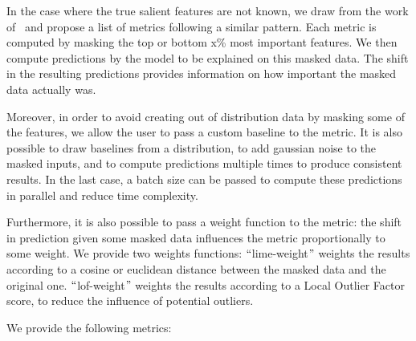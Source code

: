 In the case where the true salient features are not known, we draw from the work
of~\citep{shrikumar2017learning,deyoung2019eraser,crabbe2021explaining} and propose a list of metrics following a
similar pattern.
Each metric is computed by masking the top or bottom x\% most important features.
We then compute predictions by the model to be explained on this masked data.
The shift in the resulting predictions provides information on how important the masked data actually was.

Moreover, in order to avoid creating out of distribution data by masking some of the features, we allow the user to
pass a custom baseline to the metric.
It is also possible to draw baselines from a distribution, to add gaussian noise to the masked inputs, and to compute
predictions multiple times to produce consistent results.
In the last case, a batch size can be passed to compute these predictions in parallel and reduce time complexity.

Furthermore, it is also possible to pass a weight function to the metric: the shift in prediction given some masked
data influences the metric proportionally to some weight.
We provide two weights functions: $``$lime-weight$"$ weights the results according to a cosine or euclidean distance
between the masked data and the original one.
$``$lof-weight$"$ weights the results according to a Local Outlier Factor score, to reduce the influence of potential
outliers.

We provide the following metrics:

